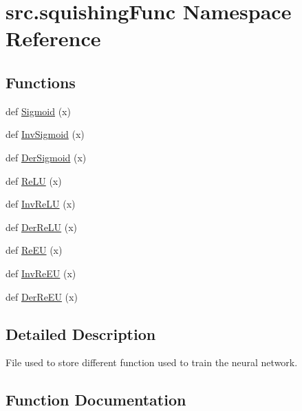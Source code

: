 \hypertarget{namespacesrc_1_1squishingFunc}{}\section{src.\+squishing\+Func Namespace Reference}
\label{namespacesrc_1_1squishingFunc}
\subsection*{Functions}
\begin{DoxyCompactItemize}
\item 
def \hyperlink{namespacesrc_1_1squishingFunc_a9f2bf373eef874c75277aba5961e88b4}{Sigmoid} (x)
\item 
def \hyperlink{namespacesrc_1_1squishingFunc_aa403a7ce6d4fa6e36af716c717b18612}{Inv\+Sigmoid} (x)
\item 
def \hyperlink{namespacesrc_1_1squishingFunc_ab9731c9ffb2745993a5c10905e93504e}{Der\+Sigmoid} (x)
\item 
def \hyperlink{namespacesrc_1_1squishingFunc_a2f14449387ddf7d1164bdd9250b905a6}{Re\+LU} (x)
\item 
def \hyperlink{namespacesrc_1_1squishingFunc_a58104ae8c45b4af7779b910fc6d855f5}{Inv\+Re\+LU} (x)
\item 
def \hyperlink{namespacesrc_1_1squishingFunc_a125d649d9dc23188a759ce2b56dd5e0a}{Der\+Re\+LU} (x)
\item 
def \hyperlink{namespacesrc_1_1squishingFunc_ac1e0f619312113d67c260469ea4a91eb}{Re\+EU} (x)
\item 
def \hyperlink{namespacesrc_1_1squishingFunc_ac2e00a56e7068f57aa4b452ede26e87d}{Inv\+Re\+EU} (x)
\item 
def \hyperlink{namespacesrc_1_1squishingFunc_a3159cc371c0909a2bc6d3e4532484155}{Der\+Re\+EU} (x)
\end{DoxyCompactItemize}


\subsection{Detailed Description}
\begin{DoxyVerb}    File used to store different function used to train the neural
    network.
\end{DoxyVerb}
 

\subsection{Function Documentation}
